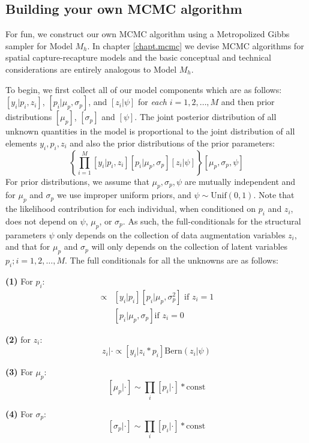 \subsection{Building your own MCMC algorithm}

For fun, we construct our own MCMC algorithm using a Metropolized
Gibbs sampler for Model $M_{h}$.  In chapter \ref{chapt.mcmc} we devise MCMC
algorithms for spatial capture-recapture models and the basic
conceptual and technical considerations are entirely analogous to
Model $M_h$.

To begin, we first collect all of our model components
which are as follows: $[y_{i}| p_{i},z_{i}]$,
$[p_{i}|\mu_{p},\sigma_{p}]$, and $[z_{i}|\psi]$
for {\it each} $i=1,2,\ldots,M$ and then prior distributions
$[\mu_{p}]$, $[\sigma_{p}]$ and $[\psi]$.
The joint posterior distribution of all unknown quantities in the model
is proportional to the joint distribution of all elements
$y_{i},p_{i},z_{i}$ and also the prior distributions of the prior parameters:
\[
\left\{ \prod_{i=1}^{M} [y_{i}|p_{i},z_{i}][p_{i}|\mu_{p},\sigma_{p}]
[z_{i}|\psi] \right\} [\mu_{p},\sigma_{p},\psi]
\]
For prior distributions, we assume that $\mu_{p},\sigma_{p}, \psi$ are
mutually independent and for $\mu_{p}$ and $\sigma_{p}$ we use
improper uniform priors, and $\psi \sim \mbox{Unif}(0,1)$.  Note that
the likelihood contribution for each individual, when conditioned on
$p_{i}$ and $z_{i}$, does not depend on $\psi$, $\mu_{p}$, or
$\sigma_{p}$.  As such, the full-conditionals for the structural
parameters $\psi$ only depends on the collection of data augmentation
variables $z_{i}$, and that for $\mu_{p}$ and $\sigma_{p}$ will only
depends on the collection of latent variables $p_{i}; i=1,2,\ldots,M$.
The full conditionals for all the unknowns are as follows:

{\bf (1)} For $p_{i}$:
\begin{eqnarray*}
[p_{i}|y_{i}, \mu_p, \sigma_{p},z_{i}=1] &\propto  &
[y_{i}|p_{i}][p_{i}|\mu_p,\sigma_{p}^{2}] \mbox{ if $z_{i}=1$ }  \\
                 &  &  [p_{i}|\mu_p,\sigma_{p}] \mbox{if $z_{i}=0$ }
\end{eqnarray*}

{\bf (2)} for $z_{i}$:
\[
z_{i} | \cdot \propto [y_{i}|z_{i}*p_{i}] \mbox{Bern}(z_{i}|\psi)
\]

{\bf (3)} For $\mu_{p}$:
\[
[\mu_{p} | \cdot ] \sim \prod_{i} [p_{i}| \cdot] *\mbox{const}
\]


{\bf (4)} For $\sigma_{p}$:
\[
[ \sigma_{p}|\cdot ] \sim\prod_{i}[p_{i}| \cdot ]*\mbox{const}
\]

